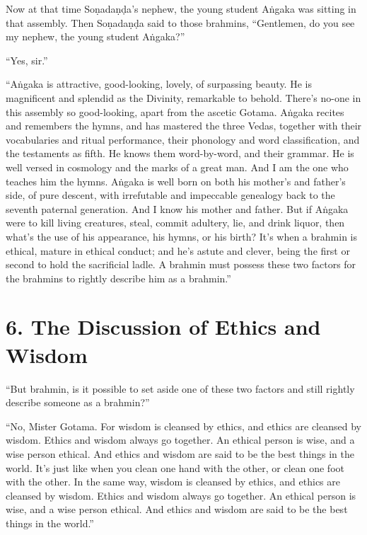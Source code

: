 \documentclass[12pt,openany]{book}%
\begin{document}
Now at that time \textsanskrit{Soṇadaṇḍa}’s nephew, the young student \textsanskrit{Aṅgaka} was sitting in that assembly. Then \textsanskrit{Soṇadaṇḍa} said to those brahmins, “Gentlemen, do you see my nephew, the young student \textsanskrit{Aṅgaka}?” 

“Yes, sir.” 

“\textsanskrit{Aṅgaka} is attractive, good-looking, lovely, of surpassing beauty. He is magnificent and splendid as the Divinity, remarkable to behold. There’s no-one in this assembly so good-looking, apart from the ascetic Gotama. \textsanskrit{Aṅgaka} recites and remembers the hymns, and has mastered the three Vedas, together with their vocabularies and ritual performance, their phonology and word classification, and the testaments as fifth. He knows them word-by-word, and their grammar. He is well versed in cosmology and the marks of a great man. And I am the one who teaches him the hymns. \textsanskrit{Aṅgaka} is well born on both his mother’s and father’s side, of pure descent, with irrefutable and impeccable genealogy back to the seventh paternal generation. And I know his mother and father. But if \textsanskrit{Aṅgaka} were to kill living creatures, steal, commit adultery, lie, and drink liquor, then what’s the use of his appearance, his hymns, or his birth? It’s when a brahmin is ethical, mature in ethical conduct; and he’s astute and clever, being the first or second to hold the sacrificial ladle. A brahmin must possess these two factors for the brahmins to rightly describe him as a brahmin.” 

\section*{6. The Discussion of Ethics and Wisdom }

“But brahmin, is it possible to set aside one of these two factors and still rightly describe someone as a brahmin?” 

“No, Mister Gotama. For wisdom is cleansed by ethics, and ethics are cleansed by wisdom. Ethics and wisdom always go together. An ethical person is wise, and a wise person ethical. And ethics and wisdom are said to be the best things in the world. It’s just like when you clean one hand with the other, or clean one foot with the other. In the same way, wisdom is cleansed by ethics, and ethics are cleansed by wisdom. Ethics and wisdom always go together. An ethical person is wise, and a wise person ethical. And ethics and wisdom are said to be the best things in the world.” 
\end{document}
